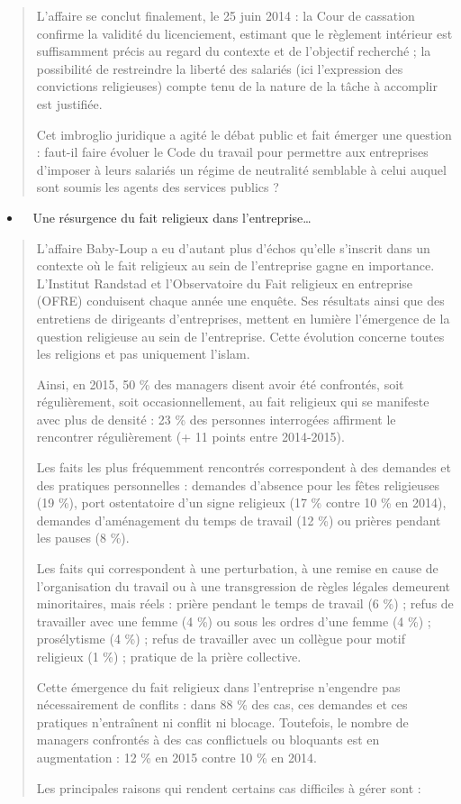 \begin{quote}
L'affaire se conclut finalement, le 25 juin 2014 : la Cour de cassation
confirme la validité du licenciement, estimant que le règlement
intérieur est suffisamment précis au regard du contexte et de l'objectif
recherché ; la possibilité de restreindre la liberté des salariés (ici
l'expression des convictions religieuses) compte tenu de la nature de la
tâche à accomplir est justifiée.

Cet imbroglio juridique a agité le débat public et fait émerger une
question : faut-il faire évoluer le Code du travail pour permettre aux
entreprises d'imposer à leurs salariés un régime de neutralité semblable
à celui auquel sont soumis les agents des services publics ?
\end{quote}

\begin{itemize}
\item ~
  Une résurgence du fait religieux dans l'entreprise\ldots{}
\end{itemize}

\begin{quote}
L'affaire Baby-Loup a eu d'autant plus d'échos qu'elle s'inscrit dans un
contexte où le fait religieux au sein de l'entreprise gagne en
importance. L'Institut Randstad et l'Observatoire du Fait religieux en
entreprise (OFRE) conduisent chaque année une enquête. Ses résultats
ainsi que des entretiens de dirigeants d'entreprises, mettent en lumière
l'émergence de la question religieuse au sein de l'entreprise. Cette
évolution concerne toutes les religions et pas uniquement l'islam.

Ainsi, en 2015, 50 \% des managers disent avoir été confrontés, soit
régulièrement, soit occasionnellement, au fait religieux qui se
manifeste avec plus de densité : 23 \% des personnes interrogées
affirment le rencontrer régulièrement (+ 11 points entre 2014-2015).



Les faits les plus fréquemment rencontrés correspondent à des demandes
et des pratiques personnelles : demandes d'absence pour les fêtes
religieuses (19 \%), port ostentatoire d'un signe religieux (17 \%
contre 10 \% en 2014), demandes d'aménagement du temps de travail (12
\%) ou prières pendant les pauses (8 \%).

Les faits qui correspondent à une perturbation, à une remise en cause de
l'organisation du travail ou à une transgression de règles légales
demeurent minoritaires, mais réels : prière pendant le temps de travail
(6 \%) ; refus de travailler avec une femme (4 \%) ou sous les ordres
d'une femme (4 \%) ; prosélytisme (4 \%) ; refus de travailler avec un
collègue pour motif religieux (1 \%) ; pratique de la prière collective.

Cette émergence du fait religieux dans l'entreprise n'engendre pas
nécessairement de conflits : dans 88 \% des cas, ces demandes et ces
pratiques n'entraînent ni conflit ni blocage. Toutefois, le nombre de
managers confrontés à des cas conflictuels ou bloquants est en
augmentation : 12 \% en 2015 contre 10 \% en 2014.

Les principales raisons qui rendent certains cas difficiles à gérer sont
:
\end{quote}

